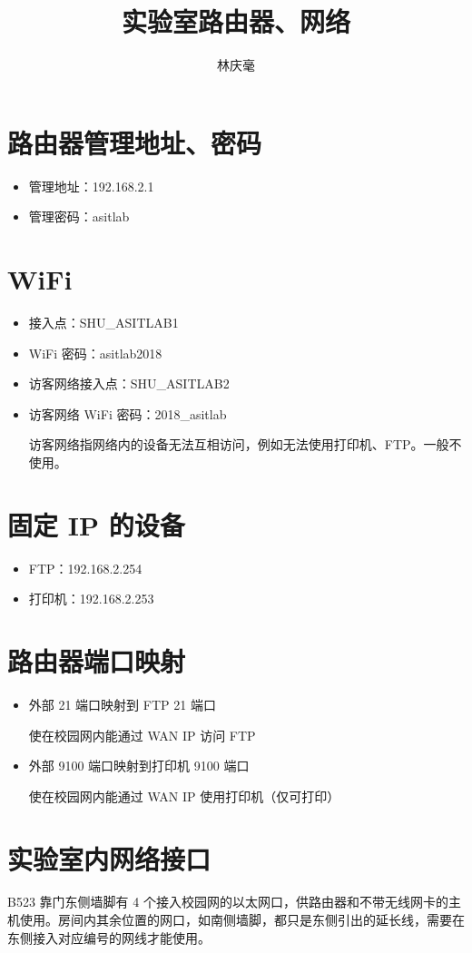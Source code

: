 \documentclass{article}
\begin{document}
\author{林庆毫}
\title{实验室路由器、网络}
\maketitle
\tableofcontents
\newpage
{}

\section{路由器管理地址、密码}
\begin{itemize}
    \item 管理地址：192.168.2.1
    \item 管理密码：asitlab
\end{itemize}

\section{WiFi}
\begin{itemize}
    \item 接入点：SHU\_ASITLAB1
    \item WiFi 密码：asitlab2018
    \item 访客网络接入点：SHU\_ASITLAB2
    \item 访客网络 WiFi 密码：2018\_asitlab
          
          访客网络指网络内的设备无法互相访问，例如无法使用打印机、FTP。一般不使用。
\end{itemize}


\section{固定 IP 的设备}
\begin{itemize}
    \item FTP：192.168.2.254
    \item 打印机：192.168.2.253
\end{itemize}

\section{路由器端口映射}
\begin{itemize}
    \item 外部 21 端口映射到 FTP 21 端口
          
          使在校园网内能通过 WAN IP 访问 FTP
          
    \item 外部 9100 端口映射到打印机 9100 端口
          
          使在校园网内能通过 WAN IP 使用打印机（仅可打印）
\end{itemize}

\section{实验室内网络接口}
B523 靠门东侧墙脚有 4 个接入校园网的以太网口，供路由器和不带无线网卡的主机使用。房间内其余位置的网口，如南侧墙脚，都只是东侧引出的延长线，需要在东侧接入对应编号的网线才能使用。
\end{document}
